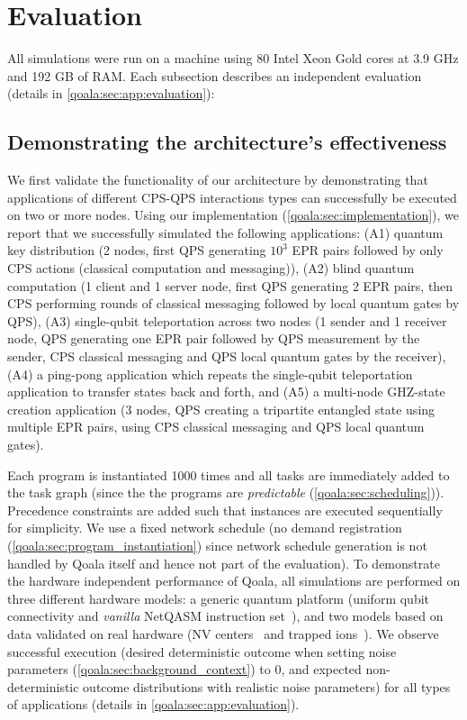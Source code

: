 \section{Evaluation}
\label{qoala:sec:evaluation}
All simulations were run on a machine using 80 Intel Xeon Gold cores at 3.9 GHz and 192 GB of RAM.
Each subsection describes an independent evaluation (details in \cref{qoala:sec:app:evaluation}):

\subsection{Demonstrating the architecture's effectiveness}
\label{qoala:sec:demonstrating_architecture_effectiveness}
We first validate the functionality of our architecture by demonstrating that applications of different CPS-QPS interactions types can successfully be executed on two or more nodes.
Using our implementation (\cref{qoala:sec:implementation}), we report that we successfully simulated the following applications:
(A1) quantum key distribution (2 nodes, first QPS generating $10^3$ EPR pairs followed by only CPS actions (classical computation and messaging)),
(A2) blind quantum computation (1 client and 1 server node, first QPS generating 2 EPR pairs, then CPS performing rounds of classical messaging followed by local quantum gates by QPS),
(A3) single-qubit teleportation across two nodes (1 sender and 1 receiver node, QPS generating one EPR pair followed by QPS measurement by the sender, CPS classical messaging and QPS local quantum gates by the receiver),
(A4) a ping-pong application which repeats the single-qubit teleportation application to transfer states back and forth,
and (A5) a multi-node GHZ-state~\cite{greenberger1989going} creation application (3 nodes, QPS creating a tripartite entangled state using multiple EPR pairs, using CPS classical messaging and QPS local quantum gates).

Each program is instantiated 1000 times and all tasks are immediately added to the task graph (since the the programs are \textit{predictable} (\cref{qoala:sec:scheduling})).
Precedence constraints are added such that instances are executed sequentially for simplicity.
We use a fixed network schedule (no demand registration (\cref{qoala:sec:program_instantiation}) since network schedule generation is not handled by Qoala itself and hence not part of the evaluation).
To demonstrate the hardware independent performance of Qoala, all simulations are performed on three different hardware models: a generic quantum platform (uniform qubit connectivity and \textit{vanilla} NetQASM instruction set~\cite{dahlberg2022netqasm}),
and two models based on data validated on real hardware (NV centers~\cite{bradley2019ten, hermans2022qubit} and trapped ions~\cite{krutyanskiy2023entanglement}). 
We observe successful execution (desired deterministic outcome when setting noise parameters (\cref{qoala:sec:background_context}) to 0, and expected non-deterministic outcome distributions with realistic noise parameters) for all types of applications (details in \cref{qoala:sec:app:evaluation}).

